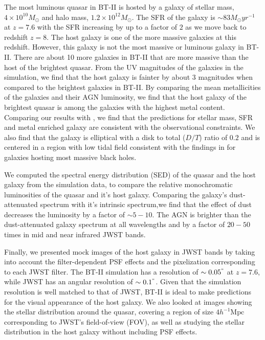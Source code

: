 \documentclass[twocolumn,useAMS,usenatbib]{mnras} \usepackage{natbib}
\newcommand{\hmpc}{\ensuremath{h^{-1}\mathrm{Mpc}}}
\begin{document}
The most luminous quasar in BT-II is hosted by a galaxy of stellar mass, $4 \times 10^{10} M_{\odot}$ and halo mass, $1.2 \times 10^{12} M_{\odot}$. The SFR of the galaxy is $\sim 83 M_{\odot} yr^{-1}$ at $z=7.6$ with the SFR increasing by up to a factor of $2$ as we move back to redshift $z=8$. The host galaxy is one of the more massive galaxies at this redshift. However, this galaxy is not the most massive or luminous galaxy in BT-II. There are about 10 more galaxies in BT-II that are more massive than the host of the brightest quasar. From the UV magnitudes of the galaxies in the simulation, we find that the host galaxy is fainter by about 3 magnitudes when compared to the brightest galaxies in BT-II. By comparing the mean metallicities of the galaxies and their AGN luminosity, we find that the host galaxy of the brightest quasar is among the galaxies with the highest metal content. Comparing our results with  \cite{2017ApJ...851L...8V}, we find that the predictions for stellar mass, SFR and metal enriched galaxy are consistent with the observational constraints. We also find that the galaxy is elliptical with a disk to total ($D/T$) ratio of $0.2$ and is centered in a region with low tidal field consistent with the findings in \cite{2017MNRAS.467.4243D} for galaxies hosting most massive black holes.

We computed the spectral energy distribution (SED) of the quasar and the host galaxy from the simulation data, to  compare the relative monochromatic luminosities of the quasar and it's host galaxy. Comparing the galaxy's dust-attenuated spectrum with it's intrinsic spectrum,we find that the effect of dust decreases the luminosity by a factor of $\sim 5 - 10$. The AGN is brighter than the dust-attenuated galaxy spectrum at all wavelengths and by a factor of $20-50$ times in mid and near infrared JWST bands.

Finally, we presented mock images of the host galaxy in JWST bands by taking into account the filter-dependent PSF effects and the pixelization  corresponding to each JWST filter. The BT-II simulation has a resolution of $\sim 0.05^{``}$ at $z=7.6$, while JWST has an angular resolution of $\sim 0.1^{``}$. Given that the simulation resolution is well matched to that of JWST, BT-II is ideal to make predictions for the visual appearance of the host galaxy. We also looked at images showing the stellar distribution around the quasar, covering a region of size $4\hmpc$ corresponding to JWST's field-of-view (FOV),  as well as studying the stellar distribution in the host galaxy without including PSF effects. 
\end{document}
